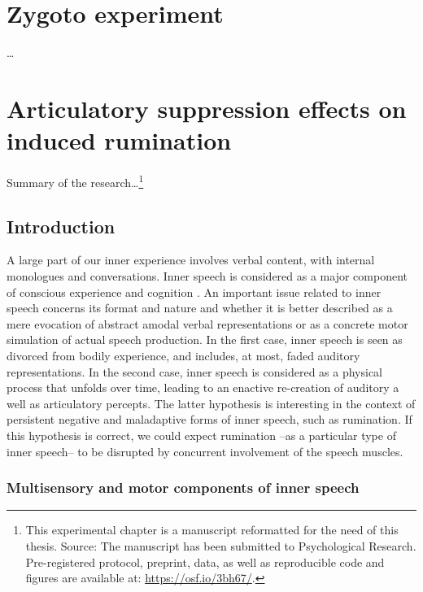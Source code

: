 \documentclass[12pt,]{book}
\let\rmarkdownfootnote\footnote%
\def\footnote{\protect\rmarkdownfootnote}
\begin{document}
\chapter{Zygoto experiment}\label{zygoto-experiment}

\ldots{}

\chapter{Articulatory suppression effects on induced
rumination}\label{articulatory-suppression-effects-on-induced-rumination}

Summary of the research\ldots{}\footnote{This experimental chapter is a
  manuscript reformatted for the need of this thesis. Source: The
  manuscript has been submitted to Psychological Research.
  Pre-registered protocol, preprint, data, as well as reproducible code
  and figures are available at: \url{https://osf.io/3bh67/}.}

\section{Introduction}\label{introduction-1}

A large part of our inner experience involves verbal content, with
internal monologues and conversations. Inner speech is considered as a
major component of conscious experience and cognition
\citep{Hubbard2010, Klinger1987, Hurlburt2013}. An important issue
related to inner speech concerns its format and nature and whether it is
better described as a mere evocation of abstract amodal verbal
representations or as a concrete motor simulation of actual speech
production. In the first case, inner speech is seen as divorced from
bodily experience, and includes, at most, faded auditory
representations. In the second case, inner speech is considered as a
physical process that unfolds over time, leading to an enactive
re-creation of auditory a well as articulatory percepts. The latter
hypothesis is interesting in the context of persistent negative and
maladaptive forms of inner speech, such as rumination. If this
hypothesis is correct, we could expect rumination --as a particular type
of inner speech-- to be disrupted by concurrent involvement of the
speech muscles.

\subsection{Multisensory and motor components of inner
speech}\label{multisensory-and-motor-components-of-inner-speech}
\end{document}
